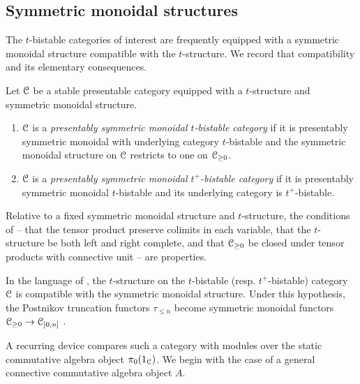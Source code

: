 \subsection{Symmetric monoidal structures}\label{subsec: symmetric monoidal structures}
The $t$-bistable categories of interest are frequently equipped with a symmetric monoidal structure compatible with the $t$-structure. We record that compatibility and its elementary consequences. 
\begin{definition}\label{def: symmetric monoidal t-bistable category}
    Let $\EuScript{C}$ be a stable presentable category equipped with a $t$-structure and symmetric monoidal structure. 
    \begin{enumerate}
        \item $\EuScript{C}$ is a \emph{presentably symmetric monoidal $t$-bistable category} if it is presentably symmetric monoidal with underlying category $t$-bistable and the symmetric monoidal structure on $\EuScript{C}$ restricts to one on $\EuScript{C}_{\geq0}$.
        \item $\EuScript{C}$ is a \emph{presentably symmetric monoidal $t^{+}$-bistable category} if it is presentably symmetric monoidal $t$-bistable and its underlying category is $t^{+}$-bistable. 
    \end{enumerate}  
\end{definition}
\begin{remark}\label{rmk: t-bistable sym mon depends is structure}
    Relative to a fixed symmetric monoidal structure and $t$-structure, the conditions of  -- that the tensor product preserve colimits in each variable, that the $t$-structure be both left and right complete, and that $\EuScript{C}_{\geq0}$ be closed under tensor products with connective unit -- are properties.
\end{remark}
\begin{remark}\label{rmk: Postnikov is symmetric monoidal}
    In the language of \cite[Ex. 2.2.1.3]{HA}, the $t$-structure on the $t$-bistable (resp. $t^{+}$-bistable) category $\EuScript{C}$ is compatible with the symmetric monoidal structure. Under this hypothesis, the Postnikov truncation functors $\tau_{\leq n}$ become symmetric monoidal functors $\EuScript{C}_{\geq0}\to\EuScript{C}_{[0,n]}$ \cite[Ex. 2.2.1.10]{HA}.
\end{remark}
A recurring device compares such a category with modules over the static commutative algebra object $\pi_{0}(1_{\EuScript{C}})$. We begin with the case of a general connective commutative algebra object $A$. 
